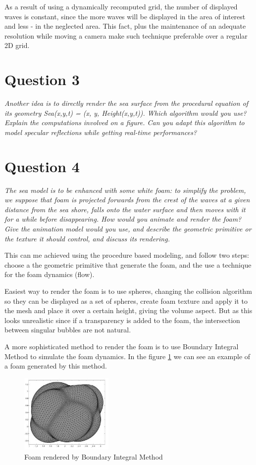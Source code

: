 \documentclass{report}
\begin{document}
As a result of using a dynamically recomputed grid, the number of
displayed waves is constant, since the more waves will be displayed in the
area of interest and less - in the neglected area. This fact, plus the
maintenance of an adequate resolution while moving a camera make such
technique preferable over a regular 2D grid.

\section{Question 3}

\emph{Another idea is to directly render the sea surface from the procedural equation of its
geometry Sea(x,y,t) = (x, y, Height(x,y,t)). Which algorithm would you use? Explain the
computations involved on a figure. Can you adapt this algorithm to model specular
reflections while getting real-time performances?}

\section{Question 4}

\emph{The sea model is to be enhanced with some white foam: to simplify the problem, we
suppose that foam is projected forwards from the crest of the waves at a given distance from
the sea shore, falls onto the water surface and then moves with it for a while before
disappearing. How would you animate and render the foam? Give the animation model would
you use, and describe the geometric primitive or the texture it should control, and discuss its
rendering.}

This can me achieved using the procedure based modeling, and follow two steps: choose a the geometric primitive that generate the foam, and the use a technique for the foam dynamics (flow). 

Easiest way to render the foam is to use spheres, changing the collision algorithm so they can be displayed as a set of spheres, create foam texture and apply it to the mesh and place it over a certain height, giving the volume aspect.
But as this looks unrealistic since if a transparency is added to the foam, the intersection between singular bubbles are not natural. 

A more sophisticated method to render the foam is to use Boundary Integral Method to simulate the foam dynamics\cite{bim}. In the figure \ref{fig:dim-foam} we can see an example of a foam generated by this method.

\begin{figure}[H]
\centering
\includegraphics[width=0.4\textwidth]{image/dim01.png}
\caption{Foam rendered by Boundary Integral Method}
\label{fig:dim-foam}
\end{figure}
\end{document}
